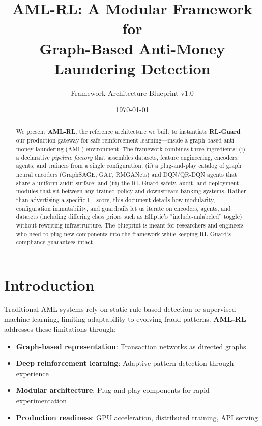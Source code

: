 \documentclass[11pt,a4paper]{article}
\title{\textbf{AML-RL: A Modular Framework for\\Graph-Based Anti-Money Laundering Detection}}
\author{Framework Architecture Blueprint v1.0}
\date{\today}
\begin{document}
\maketitle

\begin{abstract}
We present \textbf{AML-RL}, the reference architecture we built to instantiate \textbf{RL-Guard}---our production gateway for safe reinforcement learning---inside a graph-based anti-money laundering (AML) environment. The framework combines three ingredients: (i) a declarative \emph{pipeline factory} that assembles datasets, feature engineering, encoders, agents, and trainers from a single configuration; (ii) a plug-and-play catalog of graph neural encoders (GraphSAGE, GAT, RMGANets) and DQN/QR-DQN agents that share a uniform audit surface; and (iii) the RL-Guard safety, audit, and deployment modules that sit between any trained policy and downstream banking systems. Rather than advertising a specific F1 score, this document details how modularity, configuration immutability, and guardrails let us iterate on encoders, agents, and datasets (including differing class priors such as Elliptic's ``include-unlabeled'' toggle) without rewriting infrastructure. The blueprint is meant for researchers and engineers who need to plug new components into the framework while keeping RL-Guard's compliance guarantees intact.
\end{abstract}

\section{Introduction}

Traditional AML systems rely on static rule-based detection or supervised machine learning, limiting adaptability to evolving fraud patterns. \textbf{AML-RL} addresses these limitations through:

\begin{itemize}
    \item \textbf{Graph-based representation}: Transaction networks as directed graphs
    \item \textbf{Deep reinforcement learning}: Adaptive pattern detection through experience
    \item \textbf{Modular architecture}: Plug-and-play components for rapid experimentation
    \item \textbf{Production readiness}: GPU acceleration, distributed training, API serving
\end{itemize}
\end{document}
